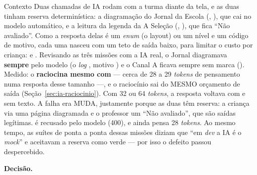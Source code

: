 \begin{especificacao}{Contexto}
Duas chamadas de IA rodam com a turma diante da tela, e as duas tinham reserva
determinística: a diagramação do Jornal da Escola (,
), que cai no modelo automático, e
a leitura da legenda da A Seleção (,
), que fica \enquote{Não avaliado}.
Como a resposta delas é um \emph{enum} (o layout) ou um nível e um código de
motivo, cada uma nasceu com um teto de saída baixo, para limitar o custo por
criança:  e . Revisando as três missões com a IA real, o Jornal diagramava
\textbf{sempre} pelo modelo (o \emph{log} ,
motivo ) e o Canal A ficava sempre sem marca
(). Medido: o 
\textbf{raciocina mesmo com } --- cerca de 28 a 29
\emph{tokens} de pensamento numa resposta desse tamanho ---, e o raciocínio sai
do MESMO orçamento de saída (Seção~\ref{sec:ia-raciocinio}). Com 32 ou 64
\emph{tokens}, a resposta voltava com  e sem
texto. A falha era MUDA, justamente porque as duas têm reserva: a criança via
uma página diagramada e o professor um \enquote{Não avaliado}, que são saídas
legítimas.  é recusado pelo modelo (400), e
 ainda pensa 28 \emph{tokens}. Ao mesmo tempo, as suítes de ponta a
ponta dessas missões diziam que \enquote{em \emph{dev} a IA é o \emph{mock}} e
aceitavam a reserva como verde --- por isso o defeito passou despercebido.
\end{especificacao}

\textbf{Decisão.}

